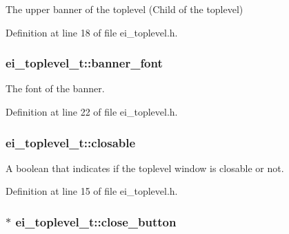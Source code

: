 The upper banner of the toplevel (Child of the toplevel) 



Definition at line 18 of file ei\+\_\+toplevel.\+h.

\hypertarget{structei__toplevel__t_a7d5368e56c6d56ae26536bce28499b32}{
\subsubsection[{banner\+\_\+font}]{ ei\+\_\+toplevel\+\_\+t\+::banner\+\_\+font}}\label{structei__toplevel__t_a7d5368e56c6d56ae26536bce28499b32}


The font of the banner. 



Definition at line 22 of file ei\+\_\+toplevel.\+h.

\hypertarget{structei__toplevel__t_a462595f505435050c9e1362fedd71fe5}{
\subsubsection[{closable}]{ ei\+\_\+toplevel\+\_\+t\+::closable}}\label{structei__toplevel__t_a462595f505435050c9e1362fedd71fe5}


A boolean that indicates if the toplevel window is closable or not. 



Definition at line 15 of file ei\+\_\+toplevel.\+h.

\hypertarget{structei__toplevel__t_a4efd970ca149d9e9f8e5d8dcabd5441b}{
\subsubsection[{close\+\_\+button}]{$\ast$ ei\+\_\+toplevel\+\_\+t\+::close\+\_\+button}}\label{structei__toplevel__t_a4efd970ca149d9e9f8e5d8dcabd5441b}


